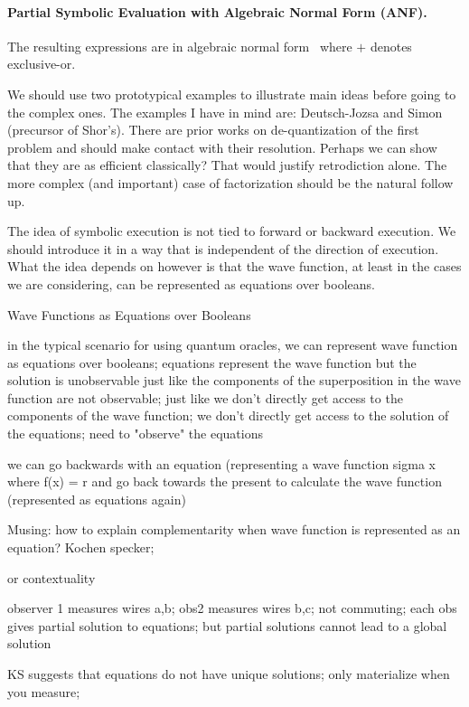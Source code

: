 \documentclass{article}
\begin{document}
\begin{refsection}
\paragraph*{Partial Symbolic Evaluation with Algebraic Normal Form (ANF).}

The resulting
expressions are in algebraic normal form~\cite{TOKAREVA20151} where
$+$ denotes exclusive-or. 

We should use two prototypical examples to illustrate main ideas
before going to the complex ones. The examples I have in mind are:
Deutsch-Jozsa and Simon (precursor of Shor's). There are prior works
on de-quantization of the first problem and should make contact with
their resolution. Perhaps we can show that they are as efficient
classically? That would justify retrodiction alone. The more complex
(and important) case of factorization should be the natural follow up.

The idea of symbolic execution is not tied to forward or backward
execution. We should introduce it in a way that is independent of the
direction of execution. What the idea depends on however is that the
wave function, at least in the cases we are considering, can be
represented as equations over booleans.

Wave Functions as Equations over Booleans

in the typical scenario for using quantum oracles, we can represent
wave function as equations over booleans; equations represent the wave
function but the solution is unobservable just like the components of
the superposition in the wave function are not observable; just like
we don't directly get access to the components of the wave function;
we don't directly get access to the solution of the equations; need to
"observe" the equations

we can go backwards with an equation (representing a wave function
sigma x where f(x) = r and go back towards the present to calculate
the wave function (represented as equations again)

Musing: how to explain complementarity when wave function is
represented as an equation? Kochen specker;
 
or contextuality
 
observer 1 measures wires a,b; obs2 measures wires b,c; not commuting;
each obs gives partial solution to equations; but partial solutions
cannot lead to a global solution
 
KS suggests that equations do not have unique solutions; only
materialize when you measure;


\end{refsection}
\end{document}
